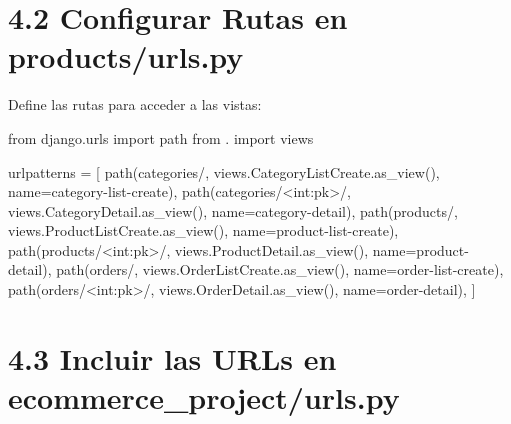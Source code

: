 \documentclass[
  a4paper,
  DIV=11,
  numbers=noendperiod,
  onepage,
  openany]{scrreprt}
\newenvironment{Shaded}{\begin{snugshade}}{\end{snugshade}}
\newcommand{\ImportTok}[1]{\textcolor[rgb]{0.00,0.46,0.62}{#1}}
\newcommand{\NormalTok}[1]{\textcolor[rgb]{0.00,0.23,0.31}{#1}}
\newcommand{\OperatorTok}[1]{\textcolor[rgb]{0.37,0.37,0.37}{#1}}
\newcommand{\StringTok}[1]{\textcolor[rgb]{0.13,0.47,0.30}{#1}}
\begin{document}
\section{4.2 Configurar Rutas en
products/urls.py}\label{configurar-rutas-en-productsurls.py}

Define las rutas para acceder a las vistas:

\begin{Shaded}
\begin{Highlighting}[]
\ImportTok{from}\NormalTok{ django.urls }\ImportTok{import}\NormalTok{ path}
\ImportTok{from}\NormalTok{ . }\ImportTok{import}\NormalTok{ views}

\NormalTok{urlpatterns }\OperatorTok{=}\NormalTok{ [}
\NormalTok{    path(}\StringTok{\textquotesingle{}categories/\textquotesingle{}}\NormalTok{, views.CategoryListCreate.as\_view(), name}\OperatorTok{=}\StringTok{\textquotesingle{}category{-}list{-}create\textquotesingle{}}\NormalTok{),}
\NormalTok{    path(}\StringTok{\textquotesingle{}categories/\textless{}int:pk\textgreater{}/\textquotesingle{}}\NormalTok{, views.CategoryDetail.as\_view(), name}\OperatorTok{=}\StringTok{\textquotesingle{}category{-}detail\textquotesingle{}}\NormalTok{),}
\NormalTok{    path(}\StringTok{\textquotesingle{}products/\textquotesingle{}}\NormalTok{, views.ProductListCreate.as\_view(), name}\OperatorTok{=}\StringTok{\textquotesingle{}product{-}list{-}create\textquotesingle{}}\NormalTok{),}
\NormalTok{    path(}\StringTok{\textquotesingle{}products/\textless{}int:pk\textgreater{}/\textquotesingle{}}\NormalTok{, views.ProductDetail.as\_view(), name}\OperatorTok{=}\StringTok{\textquotesingle{}product{-}detail\textquotesingle{}}\NormalTok{),}
\NormalTok{    path(}\StringTok{\textquotesingle{}orders/\textquotesingle{}}\NormalTok{, views.OrderListCreate.as\_view(), name}\OperatorTok{=}\StringTok{\textquotesingle{}order{-}list{-}create\textquotesingle{}}\NormalTok{),}
\NormalTok{    path(}\StringTok{\textquotesingle{}orders/\textless{}int:pk\textgreater{}/\textquotesingle{}}\NormalTok{, views.OrderDetail.as\_view(), name}\OperatorTok{=}\StringTok{\textquotesingle{}order{-}detail\textquotesingle{}}\NormalTok{),}
\NormalTok{]}
\end{Highlighting}
\end{Shaded}

\section{4.3 Incluir las URLs en
ecommerce\_project/urls.py}\label{incluir-las-urls-en-ecommerce_projecturls.py}
\end{document}
